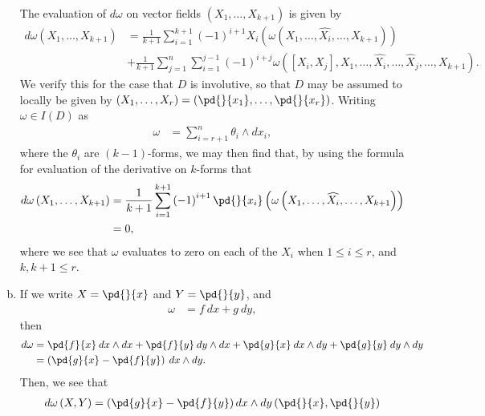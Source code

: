 \documentclass[10pt]{mypackage}
\begin{document}
\begin{solution}
\begin{enumerate}[(a)]
      The evaluation of $d\omega$ on vector fields $\left( X_1,\dots,X_{k+1} \right)$ is given by
      \begin{align*}
        d\omega\left( X_1,\dots,X_{k+1} \right) &= \frac{1}{k+1} \sum_{i=1}^{k+1} \left( -1 \right)^{i + 1} X_i\left( \omega\left( X_1,\dots,\widehat{X_i},\dots,X_{k+1} \right) \right)\\
                                                &+ \frac{1}{k+1}\sum_{j=1}^{n}\sum_{i=1}^{j-1} \left( -1 \right)^{i + j} \omega\left( \left[ X_i,X_j \right],X_1,\dots,\widehat{X_i},\dots,\widehat{X}_j,\dots,X_{k+1} \right).
      \end{align*}
      We verify this for the case that $D$ is involutive, so that $D$ may be assumed to locally be given by $ \left( X_1,\dots,X_{r} \right) = \left( \pd{}{x_1},\dots,\pd{}{x_r} \right) $. Writing $\omega\in I(D)$ as
      \begin{align*}
        \omega &= \sum_{i=r+1}^{n} \theta_{i}\wedge dx_{i},
      \end{align*}
      where the $\theta_{i}$ are $\left( k-1 \right)$-forms, we may then find that, by using the formula for evaluation of the derivative on $k$-forms that
      \begin{align*}
        d\omega\left( X_1,\dots,X_{k+1} \right) &= \frac{1}{k+1} \sum_{i=1}^{k+1} \left( -1 \right)^{i+1} \pd{}{x_{i}} \left( \omega\left( X_1,\dots,\widehat{X_i},\dots,X_{k+1} \right) \right)\\
                                                &= 0,
      \end{align*}
      where we see that $\omega$ evaluates to zero on each of the $X_i$ when $1 \leq i \leq r$, and $ k,k+1 \leq r $.
    \item If we write $ X = \pd{}{x} $ and $ Y = \pd{}{y} $, and
      \begin{align*}
        \omega &= f\:dx + g\:dy,
      \end{align*}
      then
      \begin{align*}
        d\omega &= \pd{f}{x}\:dx\wedge dx + \pd{f}{y}\:dy\wedge dx + \pd{g}{x}\:dx\wedge dy + \pd{g}{y}\:dy\wedge dy\\
                &= \left( \pd{g}{x}-\pd{f}{y} \right)\:dx\wedge dy.
      \end{align*}
      Then, we see that
      \begin{align*}
        d\omega\left( X,Y \right) &= \left( \pd{g}{x} - \pd{f}{y} \right) dx\wedge dy \left( \pd{}{x},\pd{}{y} \right)\\

\end{align*}
\end{enumerate}
\end{solution}
\end{document}

